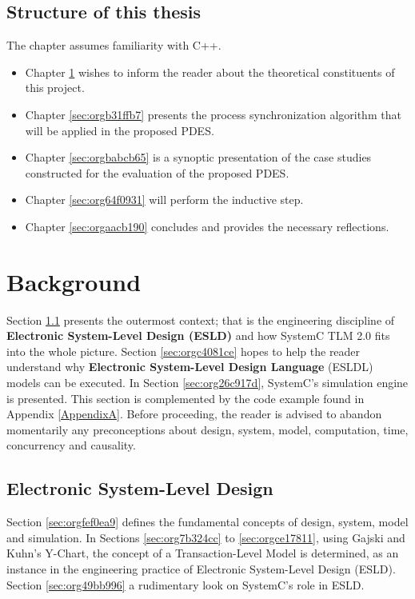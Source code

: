 \documentclass[11pt]{article}
\begin{document}
\subsection{Structure of this thesis}
\label{sec:org720dfc6}
The chapter assumes familiarity with C++.
\begin{itemize}
\item Chapter \ref{sec:orgc66a962} wishes to inform the reader about the theoretical constituents of this project.
\item Chapter \ref{sec:orgb31ffb7} presents the process synchronization algorithm that will be applied in the proposed PDES.
\item Chapter \ref{sec:orgbabcb65} is a synoptic presentation of the case studies constructed for the evaluation of the proposed PDES.
\item Chapter \ref{sec:org64f0931} will perform the inductive step.
\item Chapter \ref{sec:orgaacb190} concludes and provides the necessary reflections.
\end{itemize}
\clearpage

\section{Background}
\label{sec:orgc66a962}
Section \ref{sec:org92c8c70} presents the outermost context; that is the engineering discipline of \textbf{Electronic System-Level Design (ESLD)} and how SystemC TLM 2.0 fits into the whole picture.
Section \ref{sec:orgc4081ce} hopes to help the reader understand why \textbf{Electronic System-Level Design Language} (ESLDL) models can be executed.
In Section \ref{sec:org26c917d}, SystemC's simulation engine is presented. This section is complemented by the code example found in Appendix \ref{AppendixA}.
Before proceeding, the reader is advised to abandon momentarily any preconceptions about design, system, model, computation, time, concurrency and causality.

\subsection{Electronic System-Level Design}
\label{sec:org92c8c70}
Section \ref{sec:orgfef0ea9} defines the fundamental concepts of design, system, model and simulation.
In Sections \ref{sec:org7b324cc} to \ref{sec:orgce17811}, using Gajski and Kuhn's Y-Chart, the concept of a Transaction-Level Model is determined, as an instance in the engineering practice of Electronic System-Level Design (ESLD).
Section \ref{sec:org49bb996} a rudimentary look on SystemC's role in ESLD.
\end{document}
